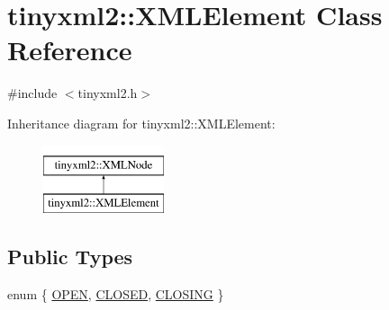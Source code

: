 \hypertarget{classtinyxml2_1_1_x_m_l_element}{}\section{tinyxml2\+:\+:X\+M\+L\+Element Class Reference}
\label{classtinyxml2_1_1_x_m_l_element}


{\ttfamily \#include $<$tinyxml2.\+h$>$}

Inheritance diagram for tinyxml2\+:\+:X\+M\+L\+Element\+:\begin{figure}[H]
\begin{center}
\leavevmode
\includegraphics[height=2.000000cm]{classtinyxml2_1_1_x_m_l_element}
\end{center}
\end{figure}
\subsection*{Public Types}
\begin{DoxyCompactItemize}
\item 
enum \{ \hyperlink{classtinyxml2_1_1_x_m_l_element_a9a3991877341c4f1dc485cea13f2344ba78cf277c55b4655c86458dfecb11d349}{O\+P\+E\+N}, 
\hyperlink{classtinyxml2_1_1_x_m_l_element_a9a3991877341c4f1dc485cea13f2344baa2f1f384020d2d4538ad2ec84930a028}{C\+L\+O\+S\+E\+D}, 
\hyperlink{classtinyxml2_1_1_x_m_l_element_a9a3991877341c4f1dc485cea13f2344baa2857344b98a931536c443cd0cadc4b7}{C\+L\+O\+S\+I\+N\+G}
 \}
\end{DoxyCompactItemize}
